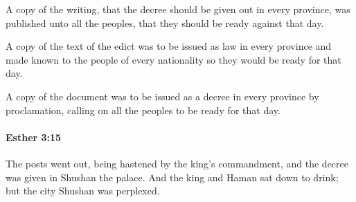 			\begin{versebox}
					\item[BHS] 
					\item[LXX] 
					\item[ASV] A copy of the writing, that the decree should be given out in every province, was published unto all the peoples, that they should be ready against that day.
					\item[NIV] A copy of the text of the edict was to be issued as law in every province and made known to the people of every nationality so they would be ready for that day.
					\item[NRSV] A copy of the document was to be issued as a decree in every province by proclamation, calling on all the peoples to be ready for that day.
			\end{versebox}

		\paragraph{Esther 3:15} %
			\label{ESTHER-3-15}

			The posts went out, being hastened by the king’s commandment, and the decree was given in Shushan the palace. And the king and Haman sat down to drink; but the city Shushan was perplexed.

